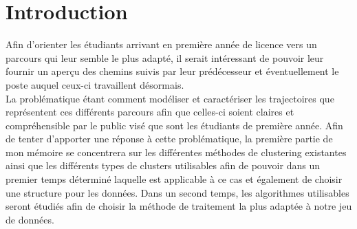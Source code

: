 \documentclass[memoire.tex]{subfiles}
\begin{document}
\newpage
\chapter*{Introduction}
Afin d'orienter les étudiants arrivant en première année de licence vers un parcours qui leur semble le plus adapté, il serait intéressant de pouvoir leur fournir un
aperçu des chemins suivis par leur prédécesseur et éventuellement le poste auquel
ceux-ci travaillent désormais.\\
La problématique étant comment modéliser et caractériser les trajectoires que représentent ces différents parcours afin que celles-ci soient claires et compréhensible par le public visé que sont les étudiants de première année.
Afin de tenter d'apporter une réponse à cette problématique, la première partie de mon mémoire se concentrera sur les différentes méthodes de clustering existantes ainsi que les différents types de clusters utilisables afin de pouvoir dans un premier temps déterminé laquelle est applicable à ce cas et également de choisir une structure pour les données. Dans un second temps, les algorithmes utilisables seront étudiés afin de choisir la méthode de traitement la plus adaptée à notre jeu de données.
\end{document}
